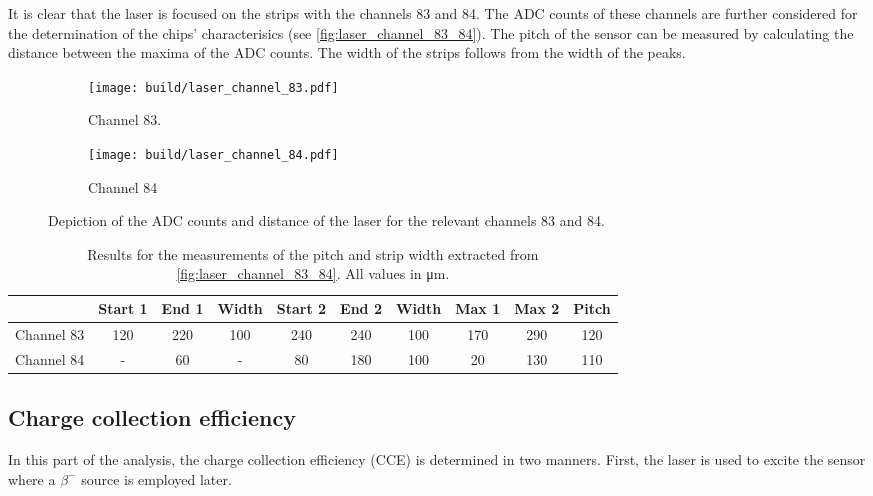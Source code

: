 It is clear that the laser is focused on the strips with the channels 83 and 84. The ADC counts of these channels are further considered for the determination of 
the chips' characterisics (see \autoref{fig:laser_channel_83_84}). The pitch of the sensor can be measured by calculating the distance between the maxima of the ADC counts. The width of the strips follows
from the width of the peaks. 
\begin{figure}
    \centering
    \begin{subfigure}{0.49\textwidth}
        \texttt{[image: build/laser\_channel\_83.pdf]}
        \caption{Channel 83.}
        \label{fig:laser_channel_83}
    \end{subfigure}
    \hfill
    \begin{subfigure}{0.49\textwidth}
        \texttt{[image: build/laser\_channel\_84.pdf]}
        \caption{Channel 84}
        \label{fig:laser_channel_84}
    \end{subfigure}
    \caption{Depiction of the ADC counts and distance of the laser for the relevant channels 83 and 84.}
    \label{fig:laser_channel_83_84}
\end{figure}

\begin{table}
    \centering
    \caption{Results for the measurements of the pitch and strip width extracted from \autoref{fig:laser_channel_83_84}. All values in \unit{\micro\metre}.}
    \label{tab:pitch_width}
    \begin{tabular}{l | c c | c || c c | c || c c | c}
      \toprule
      {} & {Start 1} & {End 1} & {Width} & {Start 2} & {End 2} & {Width} & {Max 1} & {Max 2} & {Pitch} \\
      \midrule
      {Channel 83} & 120 & 220 & 100    & 240 & 240 & 100   & 170 & 290 & 120 \\ 
      {Channel 84} &  -  &  60 &  -     &  80 & 180 & 100   &  20 & 130 & 110 \\
      \bottomrule
    \end{tabular}
  \end{table}


\subsection{Charge collection efficiency}
In this part of the analysis, the charge collection efficiency (CCE) is determined in two manners. First, the laser is used to excite the sensor where a $\beta^-$ 
source is employed later.

